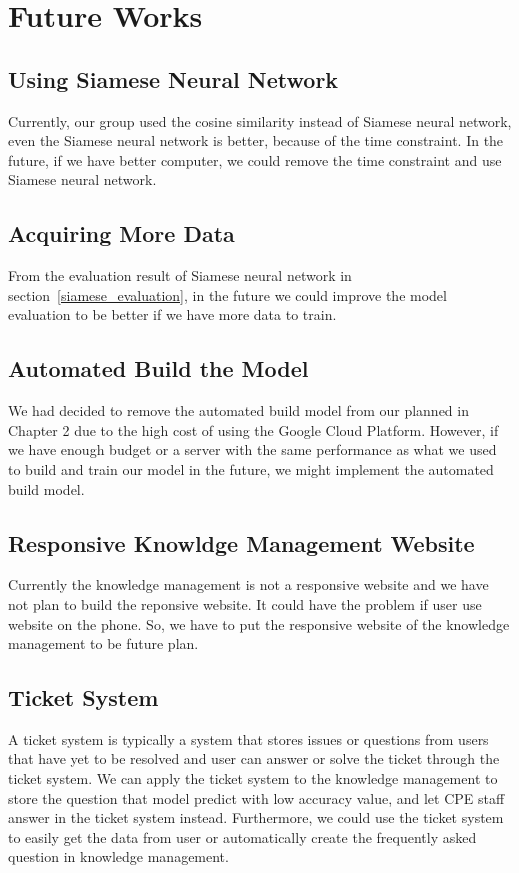 \documentclass[12pt,oneside,openright,a4paper]{cpe-english-project}
\begin{document}
\section{Future Works}
\subsection{Using Siamese Neural Network}
Currently, our group used the cosine similarity instead of Siamese neural network, even the Siamese neural network is better, because of the time constraint. In the future, if we have better computer, we could remove the time constraint and use Siamese neural network.

\subsection{Acquiring More Data}
From the evaluation result of Siamese neural network in section~\ref*{siamese_evaluation},
in the future we could improve the model evaluation to be better if we have more data to train.

\subsection{Automated Build the Model}
We had decided to remove the automated build model from our planned in Chapter 2
due to the high cost of using the Google Cloud Platform.
However, if we have enough budget or a server with the same performance
as what we used to build and train our model in the future,
we might implement the automated build model.

\subsection{Responsive Knowldge Management Website}
Currently the knowledge management is not a responsive website and we have not plan to build the reponsive website.
It could have the problem if user use website on the phone.
So, we have to put the responsive website of the knowledge management to be future plan.

\subsection{Ticket System}
A ticket system is typically a system that stores issues or questions from users that have yet to be resolved
and user can answer or solve the ticket through the ticket system.
We can apply the ticket system to the knowledge management to store the question that model predict
with low accuracy value, and let CPE staff answer in the ticket system instead.
Furthermore, we could use the ticket system to easily get the data from user or
automatically create the frequently asked question in knowledge management.
\end{document}
